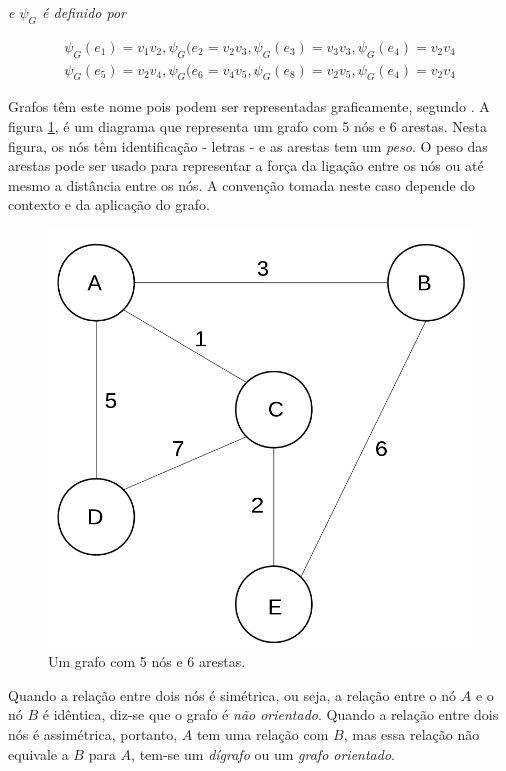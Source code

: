 \emph{e $\psi_{G}$ é definido por}

\begin{equation}
\begin{split}
\psi_{G}(e_{1}) = v_{1}v_{2}, \psi_{G}(e_{2} = v_{2}v_{3}, \psi_{G}(e_{3}) = v_{3}v_{3}, \psi_{G}(e_{4}) = v_{2}v_{4} \\
\psi_{G}(e_{5}) = v_{2}v_{4}, \psi_{G}(e_{6} = v_{4}v_{5}, \psi_{G}(e_{8}) = v_{2}v_{5}, \psi_{G}(e_{4}) = v_{2}v_{4}
\label{eq:grafo3}
\end{split}
\end{equation}

Grafos têm este nome pois podem ser representadas graficamente, segundo \citep{Bondy08}. A figura \ref{fig:grafo}, é um diagrama que representa um grafo com 5 nós e 6 arestas. Nesta figura, os nós têm identificação - letras - e as arestas tem um \emph{peso}. O peso das arestas pode ser usado para representar a força da ligação entre os nós ou até mesmo a distância entre os nós. A convenção tomada neste caso depende do contexto e da aplicação do grafo.

\begin{figure}[!htb]
\centering
\includegraphics[width=12cm]{grafo.png}
\caption{Um grafo com 5 nós e 6 arestas.}
\label{fig:grafo}
\end{figure}

Quando a relação entre dois nós é simétrica, ou seja, a relação entre o nó $A$ e o nó $B$ é idêntica, diz-se que o grafo é \emph{não orientado}. Quando a relação entre dois nós é assimétrica, portanto, $A$ tem uma relação com $B$, mas essa relação não equivale a $B$ para $A$, tem-se um \emph{dígrafo} ou um \emph{grafo orientado}.

